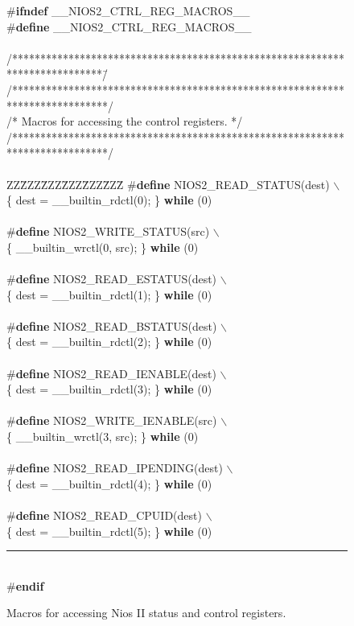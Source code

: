 \begin{figure}[h!]
\begin{center}
\begin{minipage}[t]{12.5 cm}
\begin{tabbing}
\#{\bf ifndef} \_\_NIOS2\_CTRL\_REG\_MACROS\_\_\\
\#{\bf define} \_\_NIOS2\_CTRL\_REG\_MACROS\_\_\\
~\\
/****************************************************************************\=/\kill
/*****************************************************************************/\\
/* Macros for accessing the control registers. \>*/\\
/*****************************************************************************/\\
~\\
ZZ\=ZZZ\=ZZZ\=ZZZ\=ZZZ\=ZZZ\=\kill
\#{\bf define} NIOS2\_READ\_STATUS(dest) $\backslash$\\
 \{ dest = \_\_builtin\_rdctl(0); \} {\bf while} (0)\\
~\\
\#{\bf define} NIOS2\_WRITE\_STATUS(src) $\backslash$\\
 \{ \_\_builtin\_wrctl(0, src); \} {\bf while} (0)\\
~\\
\#{\bf define} NIOS2\_READ\_ESTATUS(dest) $\backslash$\\
 \{ dest = \_\_builtin\_rdctl(1); \} {\bf while} (0)\\
~\\
\#{\bf define} NIOS2\_READ\_BSTATUS(dest) $\backslash$\\
 \{ dest = \_\_builtin\_rdctl(2); \} {\bf while} (0)\\
~\\
\#{\bf define} NIOS2\_READ\_IENABLE(dest) $\backslash$\\
 \{ dest = \_\_builtin\_rdctl(3); \} {\bf while} (0)\\
~\\
\#{\bf define} NIOS2\_WRITE\_IENABLE(src) $\backslash$\\
 \{ \_\_builtin\_wrctl(3, src); \} {\bf while} (0)\\
~\\
\#{\bf define} NIOS2\_READ\_IPENDING(dest) $\backslash$\\
 \{ dest = \_\_builtin\_rdctl(4); \} {\bf while} (0)\\
~\\
\#{\bf define} NIOS2\_READ\_CPUID(dest) $\backslash$\\
 \{ dest = \_\_builtin\_rdctl(5); \} {\bf while} (0)\\
\rule{6.0in}{0in}~\\
\#{\bf endif}
\end{tabbing}
\end{minipage}
\end{center}
	\caption{Macros for accessing Nios II status and control registers.}
   \label{fig:macros}
\end{figure}